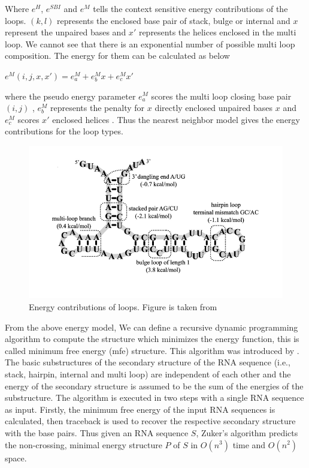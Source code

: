 \documentclass[twoside,a4paper]{report}
\numberwithin{equation}{section}
\begin{document}
 	 Where $e^H$, $e^{SBI}$ and $e^M$ tells the context sensitive energy contributions of the loops. $(k,l)$ represents the enclosed base pair of stack, bulge or internal and $x$ represent the unpaired bases and $x'$ represents the helices enclosed in the multi loop. We cannot see that there is an exponential number of possible multi loop composition. The energy for them can be calculated as below \\
 	 \begin{center}
 	 $e^M(i,j,x,x')= e^M_a+e^M_bx+e^M_cx'$\\
 	\end{center}
 	 where the pseudo energy parameter $e^M_a$ scores the multi loop closing base pair $(i,j)$ , $e^M_b$ represents the penalty for $x$ directly enclosed unpaired bases $x$ and $e^M_c$ scores $x'$ enclosed helices .
 	 Thus the nearest neighbor model gives the energy contributions for the loop types. \\
 	 
 	 \begin{figure}[h]
 	 	\includegraphics[width=0.9\linewidth]{energy}
 	 	\centering
 	 	\caption{Energy contributions of loops. Figure is taken from \citep{andronescu2010computational}}
 	 	\label{fig:energycontribution}
 	 \end{figure}
 	 
 	 
 	 From the above energy model, We can define a recursive dynamic programming algorithm to compute the structure which minimizes the energy function, this is called minimum free energy (mfe) structure. This algorithm was introduced by \citet{zuker1981optimal}.\\
 	 
 	 The basic substructures of the secondary structure of the RNA sequence (i.e., stack, hairpin, internal and multi loop) are independent of each other and the energy of the secondary structure is assumed to be the sum of the energies of the substructure. The algorithm is executed in two steps with a single RNA sequence as input. Firstly, the minimum free energy of the input RNA sequences is calculated, then traceback is used to recover the respective secondary structure with the base pairs. Thus given an RNA sequence $S$, Zuker’s algorithm predicts the non-crossing, minimal energy structure $P$ of $S$ in $O(n^3)$ time and $O(n^2)$ space.\\
 	 
\end{document}
